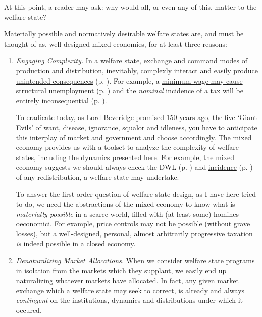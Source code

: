 At this point, a reader may ask: why would all, or even any of this, matter to the welfare state?

Materially possible and normatively desirable welfare states are, and must be thought of as, well-designed mixed economies, for at least three reasons:

\begin{enumerate}
	\item \emph{Engaging Complexity.} In a welfare state, \hyperref[sec:interface]{exchange and command modes of production and distribution, inevitably, complexly interact and easily produce unintended consequences} (p. \pageref{sec:interface}). For example, a \hyperref[sec:princecontrols]{minimum wage may cause structural unemployment} (p. \pageref{sec:pricecontrols}) and the \hyperref[sec:well-determinedincidence]{\emph{nominal} incidence of a tax will be entirely inconsequential} (p. \pageref{sec:well-determinedincidence}). 
	
	To eradicate today, as Lord Beveridge promised 150 years ago, the five `Giant Evils' of want, disease, ignorance, squalor and idleness, you have to anticipate this interplay of market and government and choose accordingly. The mixed economy provides us with a toolset to analyze the complexity of welfare states, including the dynamics presented here. For example, the mixed economy suggests we should always check the \gls{DWL} (p. \pageref{sec:minimalDWL}) and \hyperref[sec:well-determinedincidence]{incidence} (p. \pageref{sec:well-determinedincidence}) of any redistribution, a welfare state may undertake.
	
	To answer the first-order question of welfare state design, as I have here tried to do, we need the abstractions of the mixed economy to know what is \emph{materially possible} in a scarce world, filled with (at least some) homines oeconomici. For example, price controls may not be possible (without grave losses), but a well-designed, personal, almost arbitrarily progressive taxation \emph{is} indeed possible in a closed economy.	
	
	\item \emph{Denaturalizing Market Allocations.} When we consider welfare state programs in isolation from the markets which they supplant, we easily end up naturalizing whatever markets have allocated. In fact, any given market exchange which a welfare state may seek to correct, is already and always \emph{contingent} on the institutions, dynamics and distributions under which it occured. 
	

\end{enumerate}
